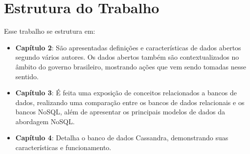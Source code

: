 \section{Estrutura do Trabalho}
Esse trabalho se estrutura em:
\begin{itemize}
\item \textbf{Capítulo 2}: São apresentadas definições e características de dados abertos segundo vários autores. Os dados abertos também são contextualizados no âmbito do governo brasileiro, mostrando ações que vem sendo tomadas nesse sentido.
\item \textbf{Capítulo 3}: É feita uma exposição de conceitos relacionados a bancos de dados, realizando uma comparação entre os bancos de dados relacionais e os bancos NoSQL, além de apresentar os principais modelos de dados da abordagem NoSQL.
\item \textbf{Capítulo 4}: Detalha o banco de dados Cassandra, demonstrando suas características e funcionamento.
\end{itemize}




